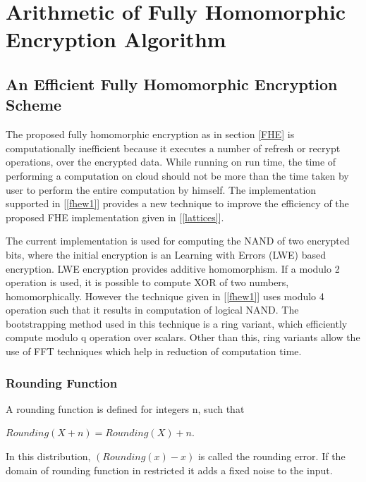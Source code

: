 \chapter{Arithmetic of Fully Homomorphic Encryption Algorithm}
\label{Chapter3}
\section{An Efficient Fully Homomorphic Encryption Scheme} \label{3.1}
The proposed fully homomorphic encryption as in section \ref{FHE} is computationally inefficient because it executes a number of refresh or recrypt operations, over the encrypted data. While running on run time, the time of performing a computation on cloud should not be more than the time taken by user to perform the entire computation by himself. The implementation supported in [\ref{fhew1}] provides a new technique to improve the efficiency of the proposed FHE implementation given in [\ref{lattices}].

The current implementation is used for computing the NAND of two encrypted bits, where the initial encryption is an Learning with Errors (LWE) based encryption. LWE encryption provides additive homomorphism. If a modulo 2 operation is used, it is possible to compute XOR of two numbers, homomorphically. However the technique given in [\ref{fhew1}] uses modulo 4 operation such that it results in computation of logical NAND. The bootstrapping method used in this technique is a ring variant, which efficiently compute modulo q operation over scalars. Other than this, ring variants allow the use of FFT techniques which help in reduction of computation time.
\subsection{Rounding Function}\label{rounding}
    A rounding  function is defined  for integers n, such that 
    
    \hspace{3cm} $Rounding(X+n)=Rounding(X)+n$.
    
    \noindent In this distribution, $(Rounding(x)-x)$ is called the rounding error. If the domain of rounding function in restricted it adds a fixed noise to the input. 

